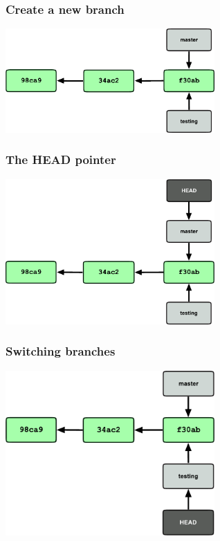 \documentclass{gittalk}
\begin{document}
\begin{frame}
  \frametitle{Create a new branch}
  \vspace*{2em}
\begin{center}
  \includegraphics[width=0.6\textwidth]{./img/fig0304.pdf}
\end{center}
\end{frame}

\begin{frame}
  \frametitle{The HEAD pointer}
\begin{center}
  \includegraphics[width=0.6\textwidth]{./img/fig0305.pdf}
\end{center}
\end{frame}

\begin{frame}
  \frametitle{Switching branches}
\begin{center}
  \includegraphics[width=0.6\textwidth]{./img/fig0306.pdf}
\end{center}
\end{frame}
\end{document}
